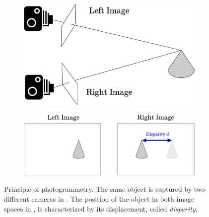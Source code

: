 \begin{figure}
    \begin{subfigure}[t]{0.5\linewidth}
        \flushleft
        \includegraphics[width=0.7\linewidth]{Images/Chap_1/Sterero_principle_1.png}
        \caption{}
        \label{fig:stereo_principle_1}
    \end{subfigure}
    \begin{subfigure}[t]{0.5\linewidth}
        \flushright
        \includegraphics[width=\linewidth]{Images/Chap_1/Sterero_principle_2.png}
        \caption{}
        \label{fig:stereo_principle_2}
    \end{subfigure}
    \caption{Principle of photogrammetry. The same object is captured by two different cameras in . The position of the object in both image spaces in , is characterized by its displacement, called \textit{disparity}.}
    \label{fig:stereo_principle}
\end{figure}

